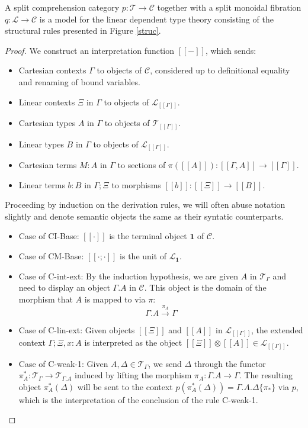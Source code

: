 \begin{thm}\label{interpret}
A split comprehension category $p : \mathcal{T} \to \mathcal{C}$ together with a split monoidal fibration $q : \mathcal{L} \to \mathcal{C}$ is a model for the linear dependent type theory consisting of the structural rules presented in Figure \ref{struc}.
\begin{proof}
  We construct an interpretation function $[[-]]$, which sends:
  \begin{itemize}
  \item Cartesian contexts $\Gamma$ to objects of $\mathcal{C}$, considered up to definitional equality and renaming of bound variables.
  \item Linear contexts $\Xi$ in $\Gamma$ to objects of $\mathcal{L}_{[[\Gamma]]}$.
  \item Cartesian types $A$ in $\Gamma$ to objects of $\mathcal{T}_{[[\Gamma]]}$.
  \item Linear types $B$ in $\Gamma$ to objects of $\mathcal{L}_{[[\Gamma]]}$.
  \item Cartesian terms $M : A$ in $\Gamma$ to sections of $\pi([[A]]) : [[\Gamma,A]] \to [[\Gamma]]$.
  \item Linear terms $b : B$ in $\Gamma; \Xi$ to morphisms $[[b]] : [[\Xi]] \to [[B]]$.
  \end{itemize}
Proceeding by induction on the derivation rules, we will often abuse notation slightly and denote semantic objects the same as their syntatic counterparts.
\begin{itemize}
\item Case of CI-Base: $[[\cdot]]$ is the terminal object $\mathbf{1}$ of $\mathcal{C}$.
\item Case of CM-Base: $[[\cdot; \cdot]]$ is the unit of $\mathcal{L}_{\mathbf{1}}$.
\item Case of C-int-ext: By the induction hypothesis, we are given $A$ in $\mathcal{T}_{\Gamma}$ and need to display an object $\Gamma.A$ in $\mathcal{C}$. This object is the domain of the morphism that $A$ is mapped to via $\pi$:
  \[\Gamma.A \xrightarrow {\pi_A} \Gamma\]
\item Case of C-lin-ext: Given objects $[[\Xi]]$ and $[[A]]$ in $\mathcal{L}_{[[\Gamma]]}$, the extended context $\Gamma; \Xi, x : A$ is interpreted as the object $[[\Xi]] \otimes [[A]] \in \mathcal{L}_{[[\Gamma]]}$.
\item Case of C-weak-1: Given $A, \Delta \in \mathcal{T}_{\Gamma}$, we send $\Delta$ through the functor $\pi_A^* : \mathcal{T}_\Gamma \to \mathcal{T}_{\Gamma.A}$ induced by lifting the morphism $\pi_A : \Gamma.A \to \Gamma$. The resulting object $\pi_A^*(\Delta)$ will be sent to the context $p(\pi_A^*(\Delta)) = \Gamma.A.\Delta\{\pi_*\}$ via $p$, which is the interpretation of the conclusion of the rule C-weak-1.

\end{itemize}
\end{proof}
\end{thm}

